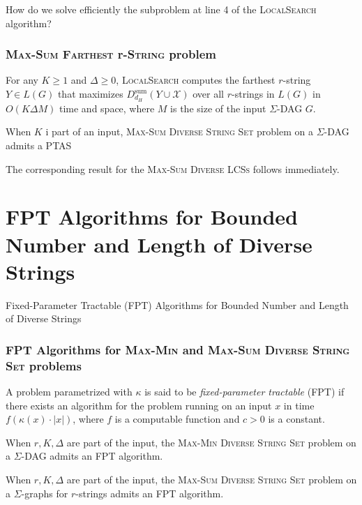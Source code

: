 \documentclass{beamer}
\begin{document}
\begin{frame}
    How do we solve efficiently the subproblem at line 4 of the \textsc{LocalSearch} algorithm?
    \frametitle{\textsc{Max-Sum Farthest} r-\textsc{String} problem}
    \begin{lemma}
        For any $K \geq 1$ and $\Delta \geq 0$, \textsc{LocalSearch} computes the farthest $r$-string $Y \in L(G)$ that maximizes $D_{d_H}^{\text{sum}}(Y \cup \mathcal{X})$ over all $r$-strings in $L(G)$ in $O(K \Delta M)$ time and space, where $M$ is the size of the input $\Sigma$-DAG $G$.
    \end{lemma}

    \begin{theorem}
        When $K$ i part of an input, \textsc{Max-Sum Diverse String Set} problem on a $\Sigma$-DAG admits a PTAS
    \end{theorem}
    The corresponding result for the \textsc{Max-Sum Diverse LCSs} follows immediately.

\end{frame}

\section{FPT Algorithms for Bounded Number and Length of Diverse Strings}
\begin{frame}
    \begin{center}
        \huge{Fixed-Parameter Tractable (FPT) Algorithms for Bounded Number and Length of Diverse Strings}
    \end{center}
\end{frame}

\begin{frame}
    \frametitle{FPT Algorithms for \textsc{Max-Min} and \textsc{Max-Sum Diverse String Set} problems}
    \begin{definition}
        A problem parametrized with $\kappa$ is said to be \emph{fixed-parameter tractable} (FPT) if there exists an algorithm for the problem running on an input $x$ in time $f(\kappa (x) \cdot |x|)$, where $f$ is a computable function and $c > 0$ is a constant.
    \end{definition}
    \begin{theorem}
        When $r, K, \Delta$ are part of the input, the \textsc{Max-Min Diverse String Set} problem on a $\Sigma$-DAG admits an FPT algorithm.
    \end{theorem}
    \begin{theorem}
        When $r, K, \Delta$ are part of the input, the \textsc{Max-Sum Diverse String Set} problem on a $\Sigma$-graphs for $r$-strings admits an FPT algorithm.
    \end{theorem}

\end{frame}
\end{document}
